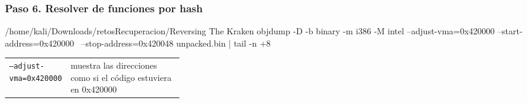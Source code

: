 \documentclass[11pt,a4paper]{article}
\begin{document}
\subsubsection*{Paso 6. Resolver de funciones por hash}
\begin{comando}{/home/kali/Downloads/retosRecuperacion/Reversing The Kraken}
objdump -D -b binary -m i386 -M intel --adjust-vma=0x420000 --start-address=0x420000 \
  --stop-address=0x420048 unpacked.bin | tail -n +8
\end{comando}
\begin{tcolorbox}[enhanced, breakable, colback=gray!3, colframe=gray!35, boxrule=0.3pt, arc=1pt, left=4pt, right=4pt, top=2pt, bottom=2pt, fonttitle=\sffamily\scriptsize\bfseries, coltitle=black!70, colbacktitle=gray!10, title={Qué hace cada parte}, attach title to upper, before skip=2pt, after skip=4pt, fontupper=\small]
\par{\renewcommand{\arraystretch}{1.12}\begin{tabularx}{\linewidth}{@{}>{\raggedright\arraybackslash}p{0.33\linewidth}>{\raggedright\arraybackslash}X@{}}
\texttt{--adjust-vma=\allowbreak{}0x420000} & muestra las direcciones como si el código estuviera en 0x420000 \\
\end{tabularx}}
\end{tcolorbox}
\end{document}
